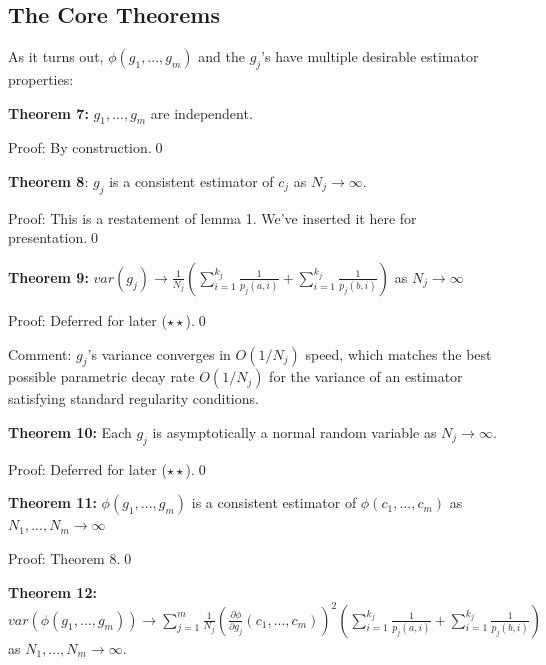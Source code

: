 \documentclass{article}
\begin{document}
\subsection{The Core Theorems}

As it turns out, $\displaystyle \phi \left( g_{1} ,...,g_{m}\right)$ and the $\displaystyle g_{j}$'s have multiple desirable estimator properties:



\textbf{Theorem 7:} $\displaystyle g_{1} ,...,g_{m}$ are independent.



Proof: By construction.\qed 



\textbf{Theorem 8}: $\displaystyle g_{j}$ is a consistent estimator of $\displaystyle c_{j}$ as $\displaystyle N_{j}\rightarrow \infty $.

Proof: This is a restatement of lemma 1. We've inserted it here for presentation.\qed 



\textbf{Theorem 9:} $\displaystyle var\left( g_{j}\right)\rightarrow \frac{1}{N_{j}}\left(\sum _{i=1}^{k_{j}}\frac{1}{p_{j}\left( a,i\right)} +\sum _{i=1}^{k_{j}}\frac{1}{p_{j}\left( b,i\right)}\right)$ as $\displaystyle N_{j}\rightarrow \infty $

Proof: Deferred for later ($\displaystyle \star \star $).\qed 



Comment: $\displaystyle g_{j}$'s variance converges in $\displaystyle O\left( 1/N_{j}\right)$ speed, which matches the best possible parametric decay rate $\displaystyle O\left( 1/N_{j}\right)$ for the variance of an estimator satisfying standard regularity conditions.



\textbf{Theorem 10:} Each $\displaystyle g_{j}$ is asymptotically a normal random variable as $\displaystyle N_{j}\rightarrow \infty $.



Proof: Deferred for later ($\displaystyle \star \star $).\qed 



\textbf{Theorem 11:} $\displaystyle \phi \left( g_{1} ,...,g_{m}\right)$ is a consistent estimator of $\displaystyle \phi \left( c_{1} ,...,c_{m}\right)$ as $\displaystyle N_{1} ,...,N_{m}\rightarrow \infty $



Proof: Theorem 8.\qed 

\textbf{Theorem 12:} $\displaystyle var\left( \phi \left( g_{1} ,...,g_{m}\right)\right)\rightarrow \sum _{j=1}^{m}\frac{1}{N_{j}}\left(\frac{\partial \phi }{\partial g_{j}}\left( c_{1} ,...,c_{m}\right)\right)^{2}\left(\sum _{i=1}^{k_{j}}\frac{1}{p_{j}\left( a,i\right)} +\sum _{i=1}^{k_{j}}\frac{1}{p_{j}\left( b,i\right)}\right)$ as $\displaystyle N_{1} ,...,N_{m}\rightarrow \infty $.
\end{document}
